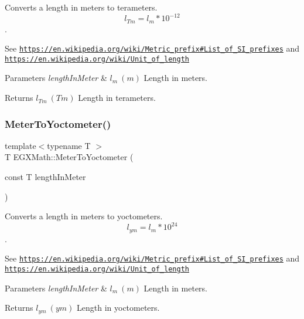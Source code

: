 Converts a length in meters to terameters. \[ l_{Tm}=l_{m} * 10^{-12} \]. 

See \href{https://en.wikipedia.org/wiki/Metric_prefix#List_of_SI_prefixes}{\tt https\+://en.\+wikipedia.\+org/wiki/\+Metric\+\_\+prefix\#\+List\+\_\+of\+\_\+\+S\+I\+\_\+prefixes} and \href{https://en.wikipedia.org/wiki/Unit_of_length}{\tt https\+://en.\+wikipedia.\+org/wiki/\+Unit\+\_\+of\+\_\+length} 
\begin{DoxyParams}{Parameters}
{\em length\+In\+Meter} & $ l_{m}\ (m)$ Length in meters. \\
\hline
\end{DoxyParams}
\begin{DoxyReturn}{Returns}
$ l_{Tm}\ (Tm)$ Length in terameters. 
\end{DoxyReturn}
\mbox{\label{group___e_g_x_math-_conversions-_length_conversions-_meter-_s_i_ga0a9af3add4234d53c0ea30906ead1c3a}} 
\subsubsection{\texorpdfstring{Meter\+To\+Yoctometer()}{MeterToYoctometer()}}
{\footnotesize\ttfamily template$<$typename T $>$ \\
T E\+G\+X\+Math\+::\+Meter\+To\+Yoctometer (\begin{DoxyParamCaption}\item[{const T}]{length\+In\+Meter }\end{DoxyParamCaption})}



Converts a length in meters to yoctometers. \[ l_{ym}=l_{m} * 10^{24} \]. 

See \href{https://en.wikipedia.org/wiki/Metric_prefix#List_of_SI_prefixes}{\tt https\+://en.\+wikipedia.\+org/wiki/\+Metric\+\_\+prefix\#\+List\+\_\+of\+\_\+\+S\+I\+\_\+prefixes} and \href{https://en.wikipedia.org/wiki/Unit_of_length}{\tt https\+://en.\+wikipedia.\+org/wiki/\+Unit\+\_\+of\+\_\+length} 
\begin{DoxyParams}{Parameters}
{\em length\+In\+Meter} & $ l_{m}\ (m)$ Length in meters. \\
\hline
\end{DoxyParams}
\begin{DoxyReturn}{Returns}
$ l_{ym}\ (ym)$ Length in yoctometers. 
\end{DoxyReturn}
\mbox{\label{group___e_g_x_math-_conversions-_length_conversions-_meter-_s_i_ga53fdb093b4572363a0ae9be4ced2ecb4}} 
